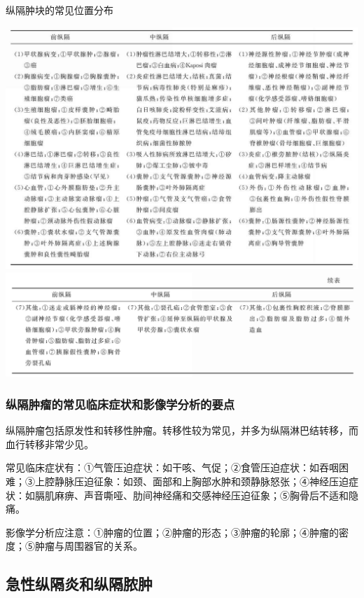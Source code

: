 \begin{table}[htbp]
\centering
\caption{纵隔肿块的常见位置分布}
\label{tab9-15}
\includegraphics[width=\textwidth,height=\textheight,keepaspectratio]{./images/Image00252.jpg}
\includegraphics[width=\textwidth,height=\textheight,keepaspectratio]{./images/Image00253.jpg}
\end{table}



\subsubsection{纵隔肿瘤的常见临床症状和影像学分析的要点}

纵隔肿瘤包括原发性和转移性肿瘤。转移性较为常见，并多为纵隔淋巴结转移，而血行转移非常少见。

常见临床症状有：①气管压迫症状：如干咳、气促；②食管压迫症状：如吞咽困难；③上腔静脉压迫征象：如颈、面部和上胸部水肿和颈静脉怒张；④神经压迫症状：如膈肌麻痹、声音嘶哑、肋间神经痛和交感神经压迫征象；⑤胸骨后不适和隐痛。

影像学分析应注意：①肿瘤的位置；②肿瘤的形态；③肿瘤的轮廓；④肿瘤的密度；⑤肿瘤与周围器官的关系。

\subsection{急性纵隔炎和纵隔脓肿}

